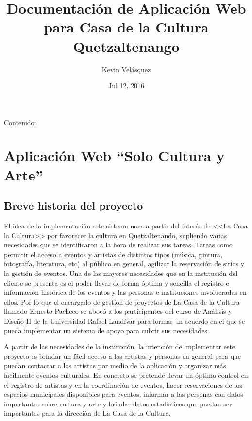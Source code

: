 \documentclass[letterpaper,11pt,spanish]{sphinxmanual}
\title{Documentación de Aplicación Web para Casa de la Cultura Quetzaltenango}
\date{Jul 12, 2016}
\author{Kevin Velásquez}
\begin{document}
\maketitle
\tableofcontents
{}\label{index::doc}

Contenido:


\chapter{Aplicación Web ``Solo Cultura y Arte''}
\label{objetivos::doc}\label{objetivos:aplicacion-web-solo-cultura-y-arte}\label{objetivos:bienvenido-a-la-documentacion-de-aplicacion-web-para-casa-de-la-cultura-quetzaltenango}

\section{Breve historia del proyecto}
\label{objetivos:breve-historia-del-proyecto}
El idea de la implementación este sistema nace a partir del interés de \textless{}\textless{}La Casa
la Cultura\textgreater{}\textgreater{} por favorecer la cultura en Quetzaltenando, supliendo varias necesidades
que se identificaron a la hora de realizar sus tareas. Tareas como permitir el acceso a
eventos y artistas de distintos tipos (música, pintura, fotografía, literatura, etc)
al público en general, agilizar la reservación de sitios y la gestión de eventos.
Una de las mayores necesidades que en la institución del cliente se presenta es el poder
llevar de forma óptima y sencilla el registro e información histórica de los eventos y las
personas e instituciones involucradas en ellos.
Por lo que el encargado de gestión de proyectos de La Casa de la Cultura llamado Ernesto Pacheco
se abocó a los participantes del curso de Análisis y Diseño II de la Universidad Rafael Landívar
para formar un acuerdo en el que se pueda implementar un sistema de apoyo para cubrir sus necesidades.

A partir de las necesidades de la institución, la intención de implementar este proyecto es brindar
un fácil acceso a los artistas y personas en general para que puedan contactar a los artistas
por medio de la aplicación y organizar más facilmente eventos culturales.
En concreto se pretende llevar un óptimo control en el registro de artistas y en la coordinación de
eventos, hacer reservaciones de los espacios municipales disponibles para eventos, informar a las
personas con datos importantes sobre cultura y arte y brindar datos estadísticos que puedan ser
importantes para la dirección de La Casa de la Cultura.
\end{document}
